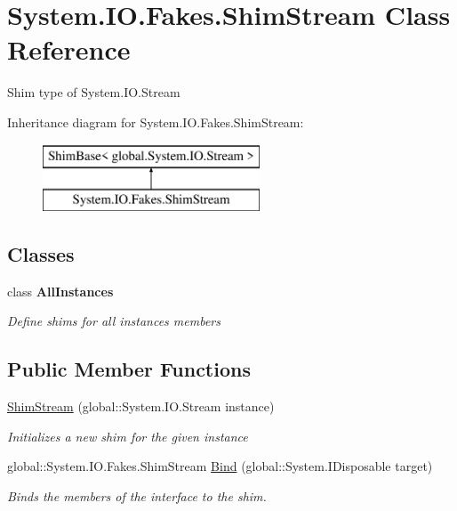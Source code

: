\hypertarget{class_system_1_1_i_o_1_1_fakes_1_1_shim_stream}{\section{System.\-I\-O.\-Fakes.\-Shim\-Stream Class Reference}
\label{class_system_1_1_i_o_1_1_fakes_1_1_shim_stream}
}


Shim type of System.\-I\-O.\-Stream 


Inheritance diagram for System.\-I\-O.\-Fakes.\-Shim\-Stream\-:\begin{figure}[H]
\begin{center}
\leavevmode
\includegraphics[height=2.000000cm]{class_system_1_1_i_o_1_1_fakes_1_1_shim_stream}
\end{center}
\end{figure}
\subsection*{Classes}
\begin{DoxyCompactItemize}
\item 
class {\bfseries All\-Instances}
\begin{DoxyCompactList}\small\item\em Define shims for all instances members\end{DoxyCompactList}\end{DoxyCompactItemize}
\subsection*{Public Member Functions}
\begin{DoxyCompactItemize}
\item 
\hyperlink{class_system_1_1_i_o_1_1_fakes_1_1_shim_stream_a5ee903f7bf98a934b694ec3a007b296a}{Shim\-Stream} (global\-::\-System.\-I\-O.\-Stream instance)
\begin{DoxyCompactList}\small\item\em Initializes a new shim for the given instance\end{DoxyCompactList}\item 
global\-::\-System.\-I\-O.\-Fakes.\-Shim\-Stream \hyperlink{class_system_1_1_i_o_1_1_fakes_1_1_shim_stream_a2ece6234102e7fb9a2619144117487ae}{Bind} (global\-::\-System.\-I\-Disposable target)
\begin{DoxyCompactList}\small\item\em Binds the members of the interface to the shim.\end{DoxyCompactList}\end{DoxyCompactItemize}
